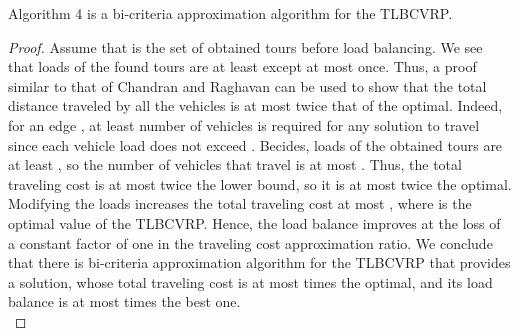  \begin{theorem} 
Algorithm 4 is a  bi-criteria approximation algorithm for the TLBCVRP.
\end{theorem} 
\begin{proof} Assume that  is the set of obtained tours before load balancing. We see that loads of the found tours are at least  except at most once. Thus, a proof similar to that of Chandran and Raghavan can be used to show that the total distance traveled by all the vehicles is at most twice that of the optimal. Indeed, for an edge , at least  number of vehicles is required for any solution to travel  since each vehicle load does not exceed . Becides, loads of the obtained tours are at least , so the number of vehicles that travel  is at most . Thus, the total traveling cost is at most twice the lower bound, so it is at most twice the optimal.\\
\indent Modifying the loads increases the total traveling cost at most , where  is the optimal value of the TLBCVRP. Hence, the load balance improves at the loss of a constant factor of one in the traveling cost approximation ratio. We conclude that there is  bi-criteria approximation algorithm for the TLBCVRP that provides a solution, whose total traveling cost is at most  times the optimal, and its load balance is at most  times the best one.\\

\end{proof}
